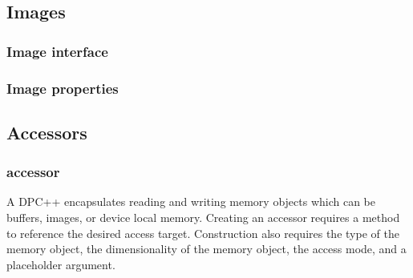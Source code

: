 \documentclass[letterpaper,10pt,english]{sphinxmanual}
\begin{document}
\subsection{Images}
\label{\detokenize{programming-interface/data/image:images}}\label{\detokenize{programming-interface/data/image::doc}}

\subsubsection{Image interface}
\label{\detokenize{programming-interface/data/image:image-interface}}

\subsubsection{Image properties}
\label{\detokenize{programming-interface/data/image:image-properties}}

\subsection{Accessors}
\label{\detokenize{programming-interface/data/accessor:accessors}}\label{\detokenize{programming-interface/data/accessor::doc}}

\subsubsection{accessor}
\label{\detokenize{programming-interface/data/accessor:accessor}}
\begin{sphinxVerbatim}[commandchars=\\\{\}]
     
     
     
       
       
  
\end{sphinxVerbatim}

A DPC++  encapsulates reading and writing memory objects
which can be buffers, images, or device local memory. Creating an
accessor requires a method to reference the desired access target.
Construction also requires the type of the memory object, the
dimensionality of the memory object, the access mode, and a placeholder
argument.
\end{document}

